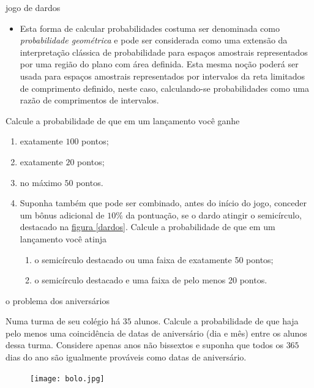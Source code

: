 \begin{task}{jogo de dardos}
\begin{itemize}
\item {} 
Esta forma de calcular probabilidades costuma ser denominada como \textit{probabilidade geométrica} e pode ser considerada como uma extensão da interpretação clássica de probabilidade para espaços amostrais representados por uma região do plano com área definida. Esta mesma noção poderá ser usada para espaços amostrais representados por intervalos da reta limitados de comprimento definido, neste caso, calculando-se probabilidades como uma razão de comprimentos de intervalos.

\end{itemize}

Calcule a probabilidade de que em um lançamento você ganhe
\begin{enumerate}
\item {} 
exatamente $100$ pontos;

\item {} 
exatamente $20$ pontos;

\item {} 
no máximo $50$ pontos.

\item {} 
Suponha também que pode ser combinado, antes do início do jogo, conceder um bônus adicional de $10\%$ da pontuação, se o dardo atingir o semicírculo, destacado na \hyperref[dardos]{figura \ref{dardos}}. Calcule a probabilidade de que em um lançamento você atinja
\begin{enumerate}
\item {} 
o semicírculo destacado ou uma faixa de exatamente 50 pontos;

\item {} 
o semicírculo destacado e uma faixa de pelo menos 20 pontos.

\end{enumerate}

\end{enumerate}
\end{task}

\begin{task}{o problema dos aniversários}


Numa turma de seu colégio há $35$ alunos. Calcule a probabilidade de que haja pelo menos uma coincidência de datas de aniversário (dia e mês) entre os alunos dessa turma. Considere apenas anos não bissextos e suponha que todos os $365$ dias do ano são igualmente prováveis como datas de aniversário.

\begin{figure}[H]
\centering

\noindent\texttt{[image: bolo.jpg]}
\end{figure}
\end{task}

